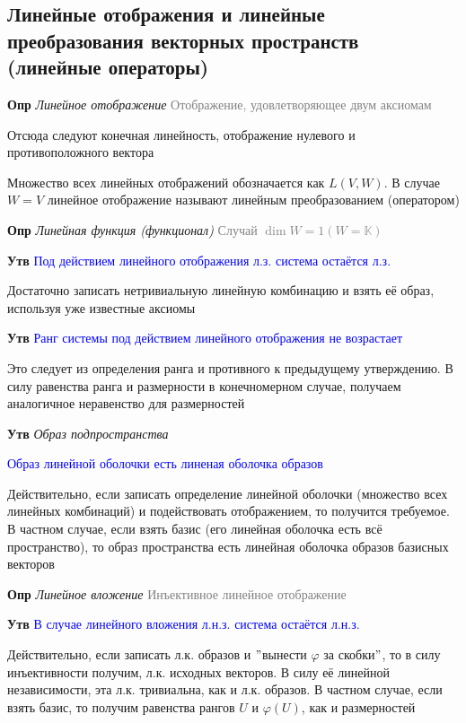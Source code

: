 \subsection{Линейные отображения и линейные преобразования векторных пространств (линейные операторы)}

\textbf{Опр} \textit{Линейное отображение} \textcolor{gray}{Отображение, удовлетворяющее двум аксиомам}

Отсюда следуют конечная линейность, отображение нулевого и противоположного вектора

Множество всех линейных отображений обозначается как $L(V, W)$.
В случае $W = V$ линейное отображение называют линейным преобразованием (оператором)

\textbf{Опр} \textit{Линейная функция (функционал)} \textcolor{gray}{Случай $\dim W = 1 (W = \mathbb{K})$}

\textbf{Утв} \textcolor{blue}{Под действием линейного отображения л.з. система остаётся л.з.}

Достаточно записать нетривиальную линейную комбинацию и взять её образ, используя уже известные аксиомы

\textbf{Утв} \textcolor{blue}{Ранг системы под действием линейного отображения не возрастает}

Это следует из определения ранга и противного к предыдущему утверждению.
В силу равенства ранга и размерности в конечномерном случае, получаем аналогичное неравенство для размерностей

\textbf{Утв} \textit{Образ подпространства}

\textcolor{blue}{Образ линейной оболочки есть линеная оболочка образов}

Действительно, если записать определение линейной оболочки (множество всех линейных комбинаций) и подействовать
отображением, то получится требуемое.
В частном случае, если взять базис (его линейная оболочка есть всё пространство), то образ пространства есть линейная
оболочка образов базисных векторов

\textbf{Опр} \textit{Линейное вложение} \textcolor{gray}{Инъективное линейное отображение}

\textbf{Утв} \textcolor{blue}{В случае линейного вложения л.н.з. система остаётся л.н.з.}

Действительно, если записать л.к. образов и \("\)вынести $\varphi$ за скобки\("\), то в силу инъективности
получим, л.к. исходных векторов.
В силу её линейной независимости, эта л.к. тривиальна, как и л.к. образов.
В частном случае, если взять базис, то получим равенства рангов $U$ и $\varphi (U)$, как и размерностей

